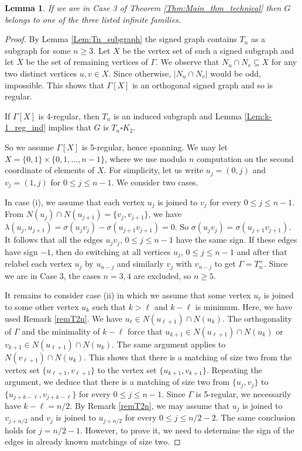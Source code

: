 \documentclass[11pt]{article}
\theoremstyle{plain}
\newtheorem{lemma}[theorem]{Lemma}
\theoremstyle{definition}
\begin{document}
\begin{lemma}
    If we are in Case 3 of Theorem \ref{Thm:Main_thm_technical} then $G$ belongs to one of the three listed infinite families. 
\end{lemma}


\begin{proof}
By Lemma \ref{Lem:Tn_subgraph} the signed graph contains $T_n$ as a subgraph for some $n\geqslant 3.$ Let $X$ be the vertex  set of such a signed subgraph and let $\overline{X}$ be the set of
remaining vertices of $\Gamma$.
We  observe  that  $N_u\cap N_v\subseteq  X$ for  any two distinct vertices  $u,v\in X$. Since otherwise, $|N_u\cap N_v|$ would be odd, impossible.
This shows that $\Gamma[X]$ is an  orthogonal signed graph and so is regular.

If  $\Gamma[X]$ is 4-regular, then $T_n$ is an induced subgraph and Lemma \ref{Lem:k-1_reg_ind} implies that $G$ is $T_n\square K_2$.

So we assume  $\Gamma[X]$ is 5-regular, hence spanning.
We may let  $X=\{0,1\}\times\{0,1,\ldots,n-1\}$, where we use modulo $n$ computation on the second coordinate of elements of $X$.
 For simplicity, let us  write  $u_j=(0,j)$ and $v_j=(1,j)$ for  $0\leqslant j \leqslant n-1$.
We consider two cases.

In case (i),  we assume that each vertex $u_j$ is joined  to
$v_j$ for every $0\leqslant j\leqslant n-1$.   From  $N(u_j)\cap N(u_{j+1})=\{v_j,v_{j+1}\}$, we have
$\lambda(u_j,u_{j+1})=\sigma(u_jv_j)-\sigma(u_{j+1}v_{j+1})=0.$
So $\sigma(u_jv_j)=\sigma(u_{j+1}v_{j+1})$. It follows that  all the edges $u_jv_j$, $0\leqslant j\leqslant n-1$ have the same sign.
 If these edges have sign $-1$, then
do switching at all vertices $u_j$, $0\leqslant j\leqslant n-1$ and after that relabel each vertex $u_j$ by $u_{n-j}$ and similarly $v_j$ with $v_{n-j}$
 to get $\Gamma=T^+_{n}$.
Since we are in Case 3, the cases $n=3,4$ are excluded, so $n\geqslant 5$.

It remains to consider case (ii) in which we assume that  some vertex $u_{\ell}$ is joined  to
some other vertex $u_k$ such that   $k> \ell$ and $k-\ell$ is minimum. Here, we have used Remark \ref{remT2n}.
We have $u_{\ell}\in N(u_{\ell+1})\cap N(u_{k})$. The orthogonality of $\Gamma$ and the minimality of $k-\ell$ force that $u_{k+1}\in N(u_{\ell+1})\cap N(u_k)$ or
$v_{k+1}\in N(u_{\ell+1})\cap N(u_k)$. The same argument applies to $N(v_{\ell+1})\cap N(u_{k})$.
This shows that there is a matching of size two from the vertex set $\{u_{\ell+1},v_{\ell+1}\}$ to the vertex set $\{u_{k+1},v_{k+1}\}$.
Repeating the argument, we deduce  that  there is a  matching of size two from $\{u_j,v_j\}$ to  $\{u_{j+k-\ell},v_{j+k-\ell}\}$ for every $0\leqslant j \leqslant n-1$.
Since $\Gamma$ is 5-regular, we necessarily  have $k-\ell=n/2$. By Remark  \ref{remT2n},  we  may  assume that   $u_j$ is joined to $v_{j+n/2}$ and $v_j$ is joined to
$u_{j+n/2}$ for every $0\leqslant j \leqslant n/2-2$. The same conclusion holds for $j=n/2-1$. However, to prove it, we need to determine the sign of the edges in already known matchings of size two.


\end{proof}
\end{document}
